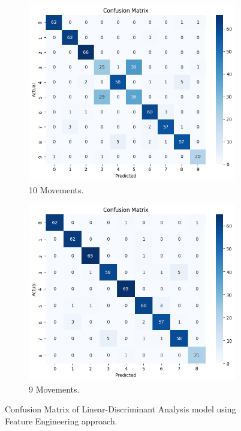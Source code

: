             \begin{figure}[h]
                \begin{subfigure}{.5\textwidth}
                \centering
                  \includegraphics[width=1.\linewidth]{../src/resources/plots/fe.png}
                  \caption{10 Movements.}
                  \label{fig:cm_all}
                \end{subfigure}%
                \begin{subfigure}{.5\textwidth}
                \centering
                  \includegraphics[width=1.\linewidth]{../src/resources/plots/fe-remove.png}
                  \caption{9 Movements.}
                  \label{fig:cm_remove}
                \end{subfigure}
                \caption{Confusion Matrix of Linear-Discriminant Analysis model using Feature Engineering approach.}
            \end{figure}
            
